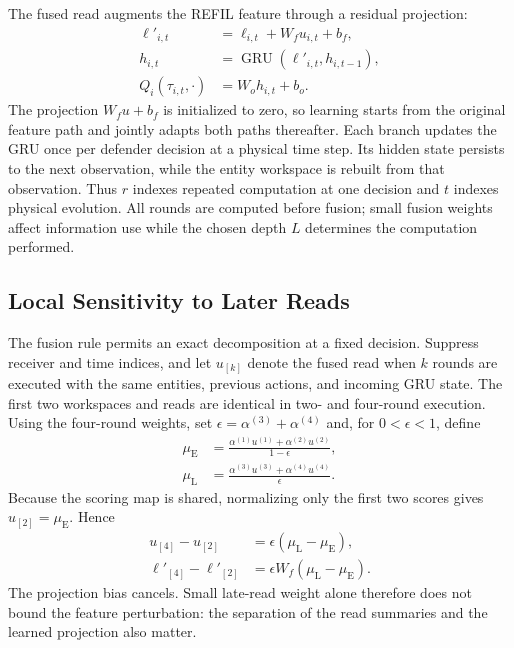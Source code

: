 The fused read augments the REFIL feature through a residual projection:
\begin{align}
 \ell'_{i,t}&=\ell_{i,t}+W_f u_{i,t}+b_f,\nonumber\\
 h_{i,t}&=\operatorname{GRU}(\ell'_{i,t},h_{i,t-1}),\nonumber\\
 Q_i(\tau_{i,t},\cdot)&=W_o h_{i,t}+b_o.
 \label{eq:decision}
\end{align}
The projection $W_fu+b_f$ is initialized to zero, so learning starts from the original feature path and jointly adapts both paths thereafter. Each branch updates the GRU once per defender decision at a physical time step. Its hidden state persists to the next observation, while the entity workspace is rebuilt from that observation. Thus $r$ indexes repeated computation at one decision and $t$ indexes physical evolution. All rounds are computed before fusion; small fusion weights affect information use while the chosen depth $L$ determines the computation performed.



\subsection{Local Sensitivity to Later Reads}
The fusion rule permits an exact decomposition at a fixed decision. Suppress receiver and time indices, and let $u_{[k]}$ denote the fused read when $k$ rounds are executed with the same entities, previous actions, and incoming GRU state. The first two workspaces and reads are identical in two- and four-round execution. Using the four-round weights, set $\epsilon=\alpha^{(3)}+\alpha^{(4)}$ and, for $0<\epsilon<1$, define
\begin{align}
 \mu_{\mathrm E}&=
 \frac{\alpha^{(1)}u^{(1)}+\alpha^{(2)}u^{(2)}}{1-\epsilon},\nonumber\\
 \mu_{\mathrm L}&=
 \frac{\alpha^{(3)}u^{(3)}+\alpha^{(4)}u^{(4)}}{\epsilon}.
 \label{eq:early-late-reads}
\end{align}
Because the scoring map is shared, normalizing only the first two scores gives $u_{[2]}=\mu_{\mathrm E}$. Hence
\begin{align}
 u_{[4]}-u_{[2]}&=\epsilon(\mu_{\mathrm L}-\mu_{\mathrm E}),\nonumber\\
 \ell'_{[4]}-\ell'_{[2]}&=
 \epsilon W_f(\mu_{\mathrm L}-\mu_{\mathrm E}).
 \label{eq:depth-perturbation}
\end{align}
The projection bias cancels. Small late-read weight alone therefore does not bound the feature perturbation: the separation of the read summaries and the learned projection also matter.

